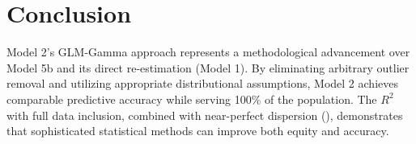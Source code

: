 \section{Conclusion}

Model 2's GLM-Gamma approach represents a methodological advancement over Model 5b and its direct re-estimation (Model 1). By eliminating arbitrary outlier removal and utilizing appropriate distributional assumptions, Model 2 achieves comparable predictive accuracy while serving 100\% of the population. The \ModelTwoRSquaredTest{} $R^2$ with full data inclusion, combined with near-perfect dispersion (\ModelTwoDispersion), demonstrates that sophisticated statistical methods can improve both equity and accuracy.

